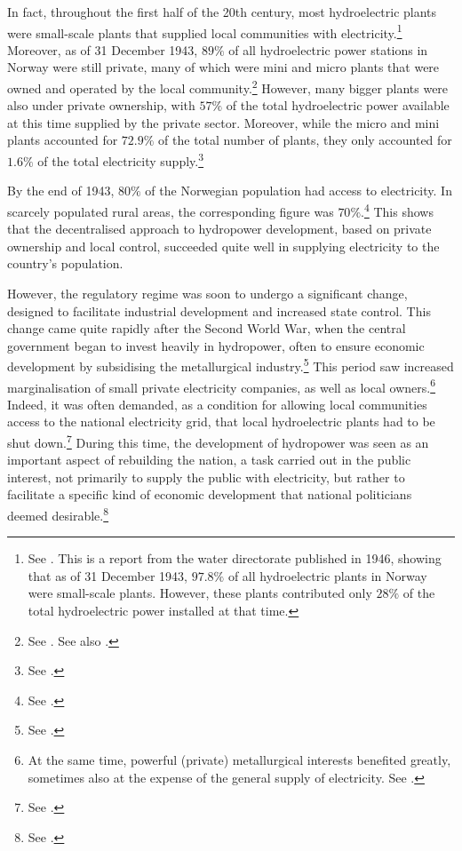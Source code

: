 In fact, throughout the first half of the 20th century, most hydroelectric plants were small-scale plants that supplied local communities with electricity.\footnote{See \cite[11]{utbygd46}. This is a report from the water directorate published in 1946, showing that as of 31 December 1943, $97.8 \%$ of all hydroelectric plants in Norway were small-scale plants. However, these plants contributed only $28 \%$ of the total hydroelectric power installed at that time.} Moreover, as of 31 December 1943, $89 \%$ of all hydroelectric power stations in Norway were still private, many of which were mini and micro plants that were owned and operated by the local community.\footnote{See \cite[6]{utbygd46}. See also \cite[111]{hindrum94}.} However, many bigger plants were also under private ownership, with $57 \%$ of the total hydroelectric power available at this time supplied by the private sector. Moreover, while the micro and mini plants accounted for $72.9 \%$ of the total number of plants, they only accounted for $1.6 \%$ of the total electricity supply.\footnote{See \cite[7]{utbygd46}.}

By the end of 1943, $80 \%$ of the Norwegian population had access to electricity. In scarcely populated rural areas, the corresponding figure was $70 \%$.\footnote{See \cite[7]{utbygd46}.} This shows that the decentralised approach to hydropower development, based on private ownership and local control, succeeded quite well in supplying electricity to the country's population.

However, the regulatory regime was soon to undergo a significant change, designed to facilitate industrial development and increased state control. This change came quite rapidly after the Second World War, when the central government began to invest heavily in hydropower, often to ensure economic development by subsidising the metallurgical industry.\footnote{See \cite[59-65]{thue96}.} This period saw increased marginalisation of small private electricity companies, as well as local owners.\footnote{At the same time, powerful (private) metallurgical interests benefited greatly, sometimes also at the expense of the general supply of electricity. See \cite[65-71]{tvedt96}.} Indeed, it was often demanded, as a condition for allowing local communities access to the national electricity grid, that local hydroelectric  plants had to be shut down.\footnote{See \cite[p.111]{hindrum94}.} During this time, the development of hydropower was seen as an important aspect of rebuilding the nation, a task carried out in the public interest, not primarily to supply the public with electricity, but rather to facilitate a specific kind of economic development that national politicians deemed desirable.\footnote{See \cite[59]{thue96}.}

